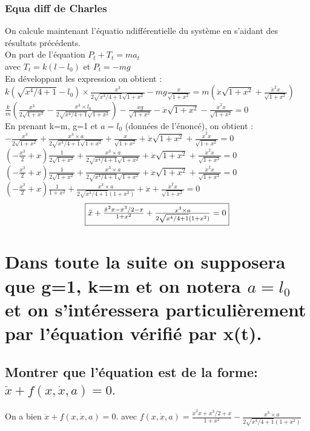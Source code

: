 \documentclass[10pt,a4paper]{article}
\begin{document}
\subsubsection{Equa diff de Charles}
On calcule maintenant l'équatio ndifférentielle du système en s'aidant des résultats précédents.\\
On part de l'équation $ P_t+T_t=ma_t $\\
avec $T_t=k(l-l_0)$ et $P_t=-mg$\\
En développant les expression on obtient :\\
$k(\sqrt{x^4/4+1}-l_0)\times \frac{x^3}{2\sqrt{x^4/4+1}\sqrt{1+x^2}}-mg\frac{x}{\sqrt{1+x^2}}=m(\ddot{x}\sqrt{1+x^2}+\frac{\ddot{x}^2x}{\sqrt{1+x^2}})$\\
$ \frac{k}{m}(\frac{x^3}{2\sqrt{1+x^2}}-\frac{x^3\times l_0}{2\sqrt{x^4/4+1}\sqrt{1+x^2}})-\frac{xg}{\sqrt{1+x^2}}-\ddot{x}\sqrt{1+x^2}-\frac{\dot{x}^2x}{\sqrt{1+x^2}}=0 $\\
En prenant k=m, g=1 et $a=l_0$ (données de l'énoncé), on obtient :\\
$ -\frac{x^3}{2\sqrt{1+x^2}}+\frac{x^3\times a}{2\sqrt{x^4/4+1}\sqrt{1+x^2}}+\frac{x}{\sqrt{1+x^2}}+\ddot{x}\sqrt{1+x^2}+\frac{\dot{x}^2x}{\sqrt{1+x^2}}=0 $\\
$ (-\frac{x^3}{2}+x)\frac{1}{2\sqrt{1+x^2}}+\frac{x^3\times a}{2\sqrt{x^4/4+1}\sqrt{1+x^2}}+\ddot{x}\sqrt{1+x^2}+\frac{\dot{x}^2x}{\sqrt{1+x^2}}=0 $\\
$ (-\frac{x^3}{2}+x)\frac{1}{2\sqrt{1+x^2}}+\frac{x^3\times a}{2\sqrt{x^4/4+1}\sqrt{1+x^2}}+\ddot{x}\sqrt{1+x^2}+\frac{\dot{x}^2x}{\sqrt{1+x^2}}=0 $\\
$ (-\frac{x^3}{2}+x)\frac{1}{1+x^2}+\frac{x^3\times a}{2\sqrt{x^4/4+1}(1+x^2)}+\ddot{x}+\frac{\dot{x}^2x}{\sqrt{1+x^2}}=0 $\\
\[ \fbox{$ \ddot{x}+\frac{\dot{x}^2x-x^3/2-x}{1+x^2}+\frac{x^3\times a}{2\sqrt{x^4/4+1}(1+x^2)}=0 $}\]

\section{Dans toute la suite on supposera que g=1, k=m et on notera $a=l_0$ et on s'intéressera particulièrement par l'équation vérifié par x(t).}
\subsection{Montrer que l'équation est de la forme: $\ddot{x} + f(x,\dot{x},a) = 0.$}
On a bien $\ddot{x} + f(x,\dot{x},a) = 0.$ avec $f(x,\dot{x},a)=\frac{\dot{x}^2x+x^3/2+x}{1+x^2}-\frac{x^3\times a}{2\sqrt{x^4/4+1}(1+x^2)}$ 
\end{document}
